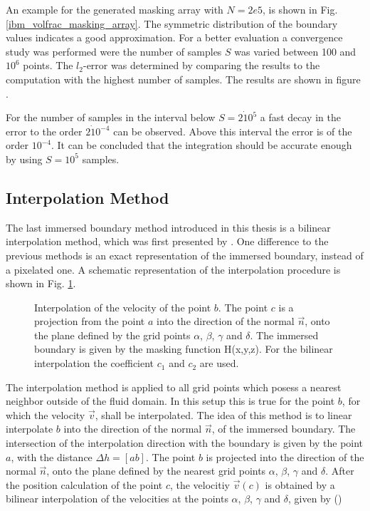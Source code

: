 An example for the generated masking array with $N=2e5$, is shown in Fig. \ref{ibm_volfrac_masking_array}.
The symmetric distribution of the boundary values indicates
a good approximation. For a better evaluation a convergence study was performed were the number of samples $S$ was varied between 100 and $10^6$ points.
The $l_2$-error was determined by comparing the results to the computation with the highest number of samples.
The results are shown in figure \label{ibm_volfrac_montecarlo}.

For the number of samples in the interval below $S=2\dot10^5$  a fast decay in the error to the order $2\dot10^{-4}$ can be observed.
Above this interval the error is of the order $10^{-4}$.
It can be concluded that the integration should be accurate enough by using $S=10^5$ samples.

\clearpage
\subsection{Interpolation Method}

The last immersed boundary method introduced in this thesis is a bilinear interpolation method, which was first presented by \citep{Gilmanov2003}.
One difference to the previous methods is an exact representation of the immersed boundary, instead of a pixelated one.
A schematic representation of the interpolation procedure is shown in Fig. \ref{ibm:ip_method_algo}.

\begin{figure}[!bp]
      \centering
      \caption{Interpolation of the velocity of the point $b$. The point $c$ is a projection from the point $a$ into the direction of the normal $\vec{n}$,
       onto the plane defined by the grid points $\alpha$, $\beta$, $\gamma$ and $\delta$. The immersed boundary is given by the masking function H(x,y,z).
       For the bilinear interpolation the coefficient $c_1$ and $c_2$ are used.
      }
    \label{ibm:ip_method_algo}
\end{figure}

The interpolation method is applied to all grid points which posess a nearest neighbor outside of the fluid domain.
In this setup this is true for the point $b$, for which the velocity $\vec{v}$, shall be interpolated.
The idea of this method is to linear interpolate $b$ into the direction of the normal $\vec{n}$, of the immersed boundary.
The intersection of the interpolation direction with the boundary is given by the point $a$, with the distance $\Delta h =[ab]$.
The point $b$ is  projected into the direction of the normal $\vec{n}$, onto the plane defined by
the nearest grid points $\alpha$, $\beta$, $\gamma$ and $\delta$.
After the position calculation of the point $c$, the velocitiy $\vec{v}(c)$ is obtained by a bilinear interpolation
of the velocities at the points $\alpha$, $\beta$, $\gamma$ and $\delta$, given by (\citep{numrecipes})

